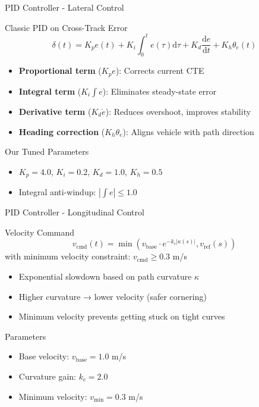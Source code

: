 \documentclass[10pt]{beamer}
\newcommand{\dd}{\mathrm{d}}
\begin{document}
\begin{frame}{PID Controller - Lateral Control}
  \begin{block}{Classic PID on Cross-Track Error}
    $$\delta(t) = K_p e(t) + K_i \int_0^t e(\tau) \dd\tau + K_d \frac{\dd e}{\dd t} + K_h \theta_e(t)$$
  \end{block}

  \begin{itemize}
    \item \textbf{Proportional term} ($K_p e$): Corrects current CTE
    \item \textbf{Integral term} ($K_i \int e$): Eliminates steady-state error
    \item \textbf{Derivative term} ($K_d \dot{e}$): Reduces overshoot, improves stability
    \item \textbf{Heading correction} ($K_h \theta_e$): Aligns vehicle with path direction
  \end{itemize}

  \vspace{0.3cm}

  \begin{block}{Our Tuned Parameters}
    \begin{itemize}
      \item $K_p = 4.0$, $K_i = 0.2$, $K_d = 1.0$, $K_h = 0.5$
      \item Integral anti-windup: $|\int e| \leq 1.0$
    \end{itemize}
  \end{block}
\end{frame}

\begin{frame}{PID Controller - Longitudinal Control}
  \begin{block}{Velocity Command}
    $$v_{\text{cmd}}(t) = \min\left(v_{\text{base}} \cdot e^{-k_c |\kappa(s)|}, v_{\text{ref}}(s)\right)$$
    with minimum velocity constraint: $v_{\text{cmd}} \geq 0.3$ m/s
  \end{block}

  \begin{itemize}
    \item Exponential slowdown based on path curvature $\kappa$
    \item Higher curvature → lower velocity (safer cornering)
    \item Minimum velocity prevents getting stuck on tight curves
  \end{itemize}

  \vspace{0.3cm}

  \begin{block}{Parameters}
    \begin{itemize}
      \item Base velocity: $v_{\text{base}} = 1.0$ m/s
      \item Curvature gain: $k_c = 2.0$
      \item Minimum velocity: $v_{\min} = 0.3$ m/s
    \end{itemize}
  \end{block}
\end{frame}
\end{document}
